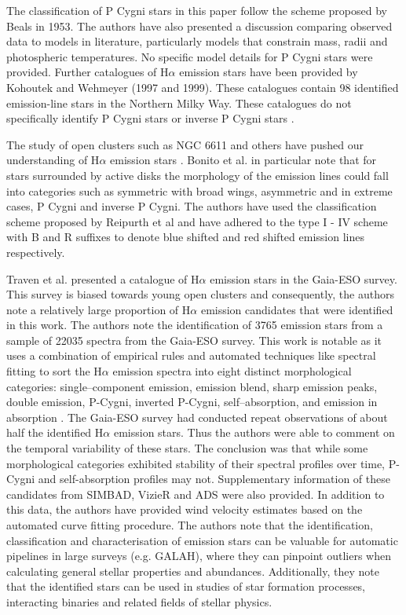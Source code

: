 The classification of P Cygni stars in this paper follow the scheme proposed by Beals in 1953\cite{1953PDAO....9....1B}. The authors have also presented a discussion comparing observed data to models in literature, particularly models that constrain mass, radii and photospheric temperatures. No specific model details for P Cygni stars were provided. Further catalogues of H$\alpha$ emission stars have been provided by Kohoutek and Wehmeyer (1997 and 1999). These catalogues contain 98 identified emission-line stars in the Northern Milky Way. These catalogues do not specifically identify P Cygni stars or inverse P Cygni stars \cite{kohoutek1999catalogue}.

The study of open clusters such as NGC 6611 and others have pushed our understanding of H$\alpha$ emission stars \cite{bonito2013spectroscopic,traven2015gaia}. Bonito et al. in particular note that for stars surrounded by active disks the morphology of the emission lines could fall into categories such as symmetric with broad wings, asymmetric and in extreme cases, P Cygni and inverse P Cygni. The authors have used the classification scheme proposed by Reipurth et al and have adhered to the type I - IV scheme with B and R suffixes to denote blue shifted and red shifted emission lines respectively. 

Traven et al. presented a catalogue of H$\alpha$ emission stars in the Gaia-ESO survey. This survey is biased towards young open clusters and consequently, the authors note a relatively large proportion of H$\alpha$ emission candidates that were identified in this work. The authors note the identification of 3765 emission stars from a sample of 22035 spectra from the Gaia-ESO survey. This work is notable as it uses a combination of empirical rules and automated techniques like spectral fitting to sort the H$\alpha$ emission spectra into eight distinct morphological categories: single–component emission, emission blend, sharp emission peaks, double emission, P-Cygni, inverted P-Cygni, self–absorption, and emission in absorption \cite{traven2015gaia}. The Gaia-ESO survey had conducted repeat observations of about half the identified H$\alpha$ emission stars. Thus the authors were able to comment on the temporal variability of these stars. The conclusion was that while some morphological categories exhibited stability of their spectral profiles over time, P-Cygni and self-absorption profiles may not. Supplementary information of these candidates from SIMBAD, VizieR and ADS were also provided. In addition to this data, the authors have provided wind velocity estimates based on the automated curve fitting procedure. The authors note that the identification, classification and characterisation of emission stars can be valuable for automatic pipelines in large surveys (e.g. GALAH), where they can pinpoint outliers when calculating general stellar properties and abundances. Additionally, they note that the identified stars can be used in studies of star formation processes, interacting binaries and related fields of stellar physics. 

